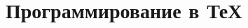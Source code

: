 \documentclass[a4paper,11pt]{book}
\begin{document}




	\part{Программирование в ТеХ}\label{Part:Programming}



	


%
%
%
\end{document}
